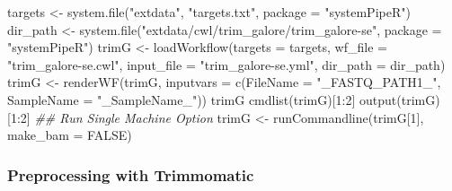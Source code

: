 \documentclass[14pt,]{article}
\newcommand{\hlnum}[1]{\textcolor[rgb]{0.816,0.125,0.439}{#1}}%
\newcommand{\hlstr}[1]{\textcolor[rgb]{0.251,0.627,0.251}{#1}}%
\newcommand{\hlcom}[1]{\textcolor[rgb]{0.502,0.502,0.502}{\textit{#1}}}%
\newcommand{\hlstd}[1]{\textcolor[rgb]{0.251,0.251,0.251}{#1}}%
\newenvironment{Shaded}{\begin{myshaded}}{\end{myshaded}}
\newcommand{\DecValTok}[1]{\hlnum{#1}}
\newcommand{\ConstantTok}[1]{\hlnum{#1}}
\newcommand{\SpecialCharTok}[1]{\hlstr{#1}}
\newcommand{\StringTok}[1]{\hlstr{#1}}
\newcommand{\DocumentationTok}[1]{\hlcom{#1}}
\newcommand{\OtherTok}[1]{{#1}}
\newcommand{\FunctionTok}[1]{\hlstd{#1}}
\newcommand{\AttributeTok}[1]{{#1}}
\newcommand{\NormalTok}[1]{\hlstd{#1}}
\begin{document}
\begin{Shaded}
\begin{Highlighting}[]
\NormalTok{targets }\OtherTok{\textless{}{-}} \FunctionTok{system.file}\NormalTok{(}\StringTok{"extdata"}\NormalTok{, }\StringTok{"targets.txt"}\NormalTok{, }\AttributeTok{package =} \StringTok{"systemPipeR"}\NormalTok{)}
\NormalTok{dir\_path }\OtherTok{\textless{}{-}} \FunctionTok{system.file}\NormalTok{(}\StringTok{"extdata/cwl/trim\_galore/trim\_galore{-}se"}\NormalTok{, }\AttributeTok{package =} \StringTok{"systemPipeR"}\NormalTok{)}
\NormalTok{trimG }\OtherTok{\textless{}{-}} \FunctionTok{loadWorkflow}\NormalTok{(}\AttributeTok{targets =}\NormalTok{ targets, }\AttributeTok{wf\_file =} \StringTok{"trim\_galore{-}se.cwl"}\NormalTok{, }\AttributeTok{input\_file =} \StringTok{"trim\_galore{-}se.yml"}\NormalTok{, }
    \AttributeTok{dir\_path =}\NormalTok{ dir\_path)}
\NormalTok{trimG }\OtherTok{\textless{}{-}} \FunctionTok{renderWF}\NormalTok{(trimG, }\AttributeTok{inputvars =} \FunctionTok{c}\NormalTok{(}\AttributeTok{FileName =} \StringTok{"\_FASTQ\_PATH1\_"}\NormalTok{, }\AttributeTok{SampleName =} \StringTok{"\_SampleName\_"}\NormalTok{))}
\NormalTok{trimG}
\FunctionTok{cmdlist}\NormalTok{(trimG)[}\DecValTok{1}\SpecialCharTok{:}\DecValTok{2}\NormalTok{]}
\FunctionTok{output}\NormalTok{(trimG)[}\DecValTok{1}\SpecialCharTok{:}\DecValTok{2}\NormalTok{]}
\DocumentationTok{\#\# Run Single Machine Option}
\NormalTok{trimG }\OtherTok{\textless{}{-}} \FunctionTok{runCommandline}\NormalTok{(trimG[}\DecValTok{1}\NormalTok{], }\AttributeTok{make\_bam =} \ConstantTok{FALSE}\NormalTok{)}
\end{Highlighting}
\end{Shaded}

\hypertarget{preprocessing-with-trimmomatic}{%
\subsubsection{Preprocessing with Trimmomatic}\label{preprocessing-with-trimmomatic}}
\end{document}
